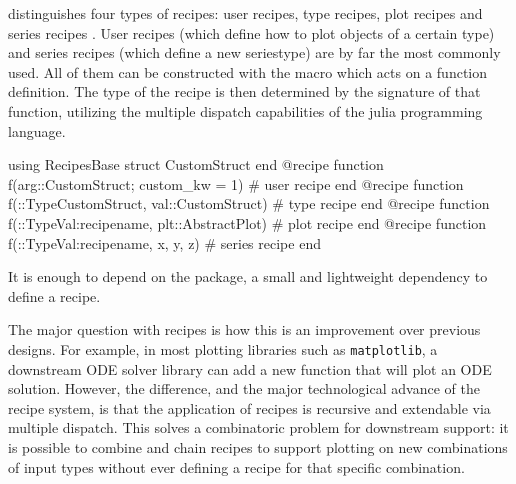 \Plots distinguishes four types of recipes: user recipes, type recipes, plot recipes and series recipes \cite{HowRecipesActually}.
User recipes (which define how to plot objects of a certain type) and series recipes (which define a new seriestype) are by far the most commonly used.
All of them can be constructed with the  macro which acts on a function definition.
The type of the recipe is then determined by the signature of that function, utilizing the multiple dispatch capabilities of the julia programming language.

\begin{code}[caption=Recipe signatures, label=lst:recipe_signature]
using RecipesBase
struct CustomStruct end
@recipe function f(arg::CustomStruct; custom_kw = 1)            # user recipe
end
@recipe function f(::Type{CustomStruct}, val::CustomStruct)     # type recipe
end
@recipe function f(::Type{Val{:recipename}}, plt::AbstractPlot) # plot recipe
end
@recipe function f(::Type{Val{:recipename}}, x, y, z)           # series recipe
end
\end{code}

It is enough to depend on the  package, a small and lightweight dependency to define a recipe.

The major question with recipes is how this is an improvement over previous designs.
For example, in most plotting libraries such as \texttt{matplotlib}\cite{Hunter:2007}, a downstream ODE solver library can add a new function  that will plot an ODE solution.
However, the difference, and the major technological advance of the \Plots recipe system, is that the application of recipes is recursive and extendable via multiple dispatch.
This solves a combinatoric problem for downstream support: it is possible to combine and chain recipes to support plotting on new combinations of input types without ever defining a recipe for that specific combination.

